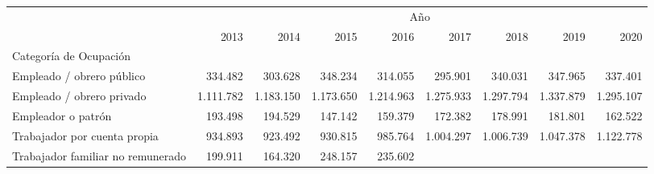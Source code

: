\begin{tabular}{lllllllll}
\cline{1-9}
\multicolumn{1}{c}{} &
  \multicolumn{8}{|c}{Año} \\
\multicolumn{1}{c}{} &
  \multicolumn{1}{|r}{2013} &
  \multicolumn{1}{r}{2014} &
  \multicolumn{1}{r}{2015} &
  \multicolumn{1}{r}{2016} &
  \multicolumn{1}{r}{2017} &
  \multicolumn{1}{r}{2018} &
  \multicolumn{1}{r}{2019} &
  \multicolumn{1}{r}{2020} \\
\cline{1-9}
\multicolumn{1}{l}{Categoría de Ocupación} &
  \multicolumn{1}{|r}{} &
  \multicolumn{1}{r}{} &
  \multicolumn{1}{r}{} &
  \multicolumn{1}{r}{} &
  \multicolumn{1}{r}{} &
  \multicolumn{1}{r}{} &
  \multicolumn{1}{r}{} &
  \multicolumn{1}{r}{} \\
\multicolumn{1}{l}{\hspace{1em}Empleado / obrero público} &
  \multicolumn{1}{|r}{334.482} &
  \multicolumn{1}{r}{303.628} &
  \multicolumn{1}{r}{348.234} &
  \multicolumn{1}{r}{314.055} &
  \multicolumn{1}{r}{295.901} &
  \multicolumn{1}{r}{340.031} &
  \multicolumn{1}{r}{347.965} &
  \multicolumn{1}{r}{337.401} \\
\multicolumn{1}{l}{\hspace{1em}Empleado / obrero privado} &
  \multicolumn{1}{|r}{1.111.782} &
  \multicolumn{1}{r}{1.183.150} &
  \multicolumn{1}{r}{1.173.650} &
  \multicolumn{1}{r}{1.214.963} &
  \multicolumn{1}{r}{1.275.933} &
  \multicolumn{1}{r}{1.297.794} &
  \multicolumn{1}{r}{1.337.879} &
  \multicolumn{1}{r}{1.295.107} \\
\multicolumn{1}{l}{\hspace{1em}Empleador o patrón} &
  \multicolumn{1}{|r}{193.498} &
  \multicolumn{1}{r}{194.529} &
  \multicolumn{1}{r}{147.142} &
  \multicolumn{1}{r}{159.379} &
  \multicolumn{1}{r}{172.382} &
  \multicolumn{1}{r}{178.991} &
  \multicolumn{1}{r}{181.801} &
  \multicolumn{1}{r}{162.522} \\
\multicolumn{1}{l}{\hspace{1em}Trabajador por cuenta propia} &
  \multicolumn{1}{|r}{934.893} &
  \multicolumn{1}{r}{923.492} &
  \multicolumn{1}{r}{930.815} &
  \multicolumn{1}{r}{985.764} &
  \multicolumn{1}{r}{1.004.297} &
  \multicolumn{1}{r}{1.006.739} &
  \multicolumn{1}{r}{1.047.378} &
  \multicolumn{1}{r}{1.122.778} \\
\multicolumn{1}{l}{\hspace{1em}Trabajador familiar no remunerado} &
  \multicolumn{1}{|r}{199.911} &
  \multicolumn{1}{r}{164.320} &
  \multicolumn{1}{r}{248.157} &
  \multicolumn{1}{r}{235.602} &

\end{tabular}
